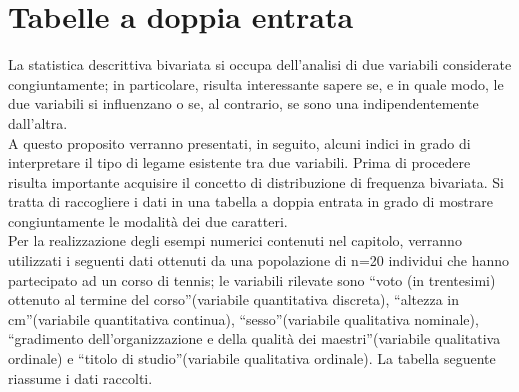 \begin{esempio}
% 
% 
\end{esempio}



\section{Tabelle a doppia entrata}
\label{sec:stat02_doppia_entrata}

La statistica descrittiva bivariata si occupa dell'analisi di due variabili 
considerate congiuntamente; in particolare, risulta interessante sapere se, 
e in quale modo, le due variabili si influenzano o se, al contrario, se 
sono una indipendentemente dall'altra.\\ 
A questo proposito verranno presentati, in seguito, alcuni indici in grado 
di interpretare il tipo di legame esistente tra due variabili. Prima di 
procedere risulta importante acquisire il concetto di distribuzione di 
frequenza bivariata. 
Si tratta di raccogliere i dati in una tabella a doppia entrata in grado di 
mostrare congiuntamente le modalità dei due caratteri.\\
Per la realizzazione degli esempi numerici contenuti nel capitolo, verranno 
utilizzati i seguenti dati ottenuti da una popolazione di n=20 individui 
che hanno partecipato ad un corso di tennis; le variabili rilevate sono 
\textquotedblleft voto (in trentesimi) ottenuto al termine del 
corso\textquotedblright (variabile quantitativa discreta), 
\textquotedblleft altezza in cm\textquotedblright (variabile quantitativa 
continua), \textquotedblleft sesso\textquotedblright (variabile qualitativa 
nominale), \textquotedblleft gradimento dell'organizzazione e della qualità 
dei maestri\textquotedblright (variabile qualitativa ordinale) e 
\textquotedblleft titolo di studio\textquotedblright (variabile qualitativa 
ordinale).
La tabella seguente riassume i dati raccolti.

